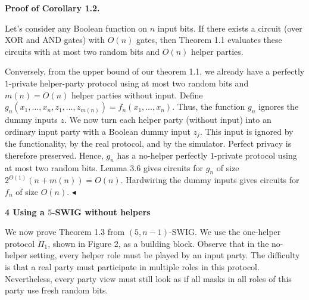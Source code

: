 \par\medskip\noindent\textbf{Proof of Corollary 1.2.}\par




Let’s consider any Boolean function on $n$ input bits. If there exists a circuit (over XOR and AND gates) with $O(n)$ gates, then Theorem 1.1 evaluates these circuits with at most two random bits and $O(n)$ helper parties.\par




Conversely, from the upper bound of our theorem 1.1, we already have a
perfectly $1$-private helper-party protocol using at most two random bits and $m(n)=O(n)$ helper parties without input. Define $g_{n}(x_{1},\dots,x_{n},z_{1},\dots,z_{m(n)})=f_{n}(x_{1},\dots,x_{n})$. Thus, the function $g_{n}$ ignores the dummy inputs $z$. We now turn each helper party (without input) into an ordinary input party with a Boolean dummy input $z_{j}$. This input is ignored by the functionality, by the real protocol, and by the simulator. Perfect privacy is therefore preserved. Hence, $g_{n}$ has a no-helper perfectly $1$-private protocol using at most two random bits. Lemma 3.6 gives circuits for $g_{n}$ of size $2^{O(1)}(n+m(n))=O(n)$. Hardwiring the dummy inputs gives circuits for $f_{n}$ of size $O(n)$.
$\blacktriangleleft$\par







\par\medskip\noindent\textbf{
4 Using a $5$-SWIG without helpers}\par




We now prove Theorem 1.3 from $(5,n-1)$-SWIG. We use the one-helper protocol $\Pi_{1}$, shown in Figure 2, as a building block. Observe that in the no-helper setting, every helper role must be played by an input party. The difficulty is that a real party must participate in multiple roles in this protocol. Nevertheless, every party view must still look as if all masks in all roles of this party use fresh random bits.\par




